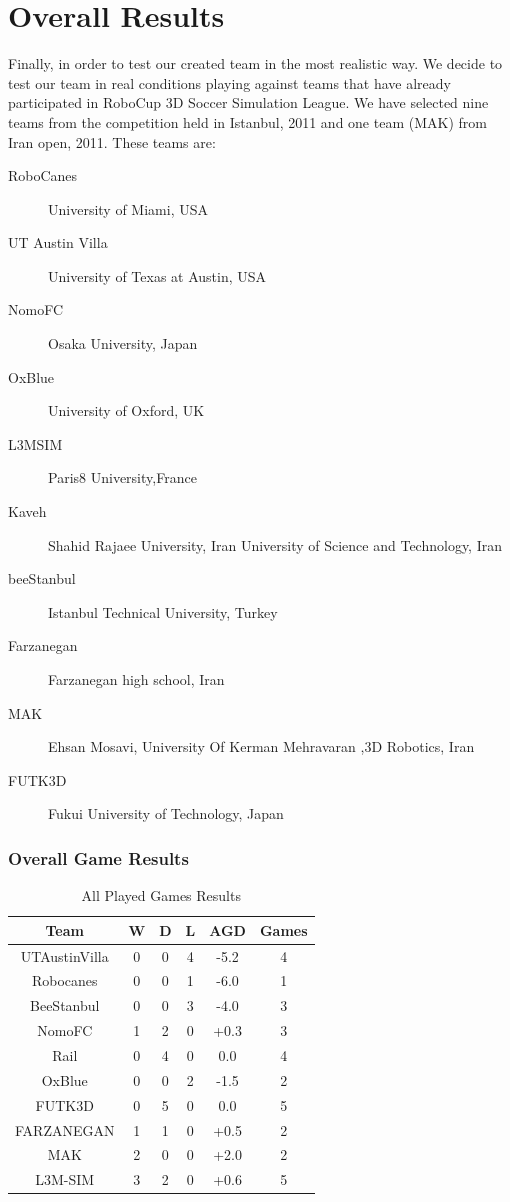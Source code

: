 \section{Overall Results}
Finally, in order to test our created team in the most realistic way. We decide to test our team in real conditions playing against teams that have already participated in RoboCup 3D Soccer Simulation League. We have selected nine teams from the competition held in Istanbul, 2011 and one team (MAK) from Iran open, 2011. These teams are:
\begin{description}
\item[RoboCanes]	University of Miami, USA 
\item[UT Austin Villa]	University of Texas at Austin, USA
\item[NomoFC]	Osaka University, Japan
\item[OxBlue]	University of Oxford, UK
\item[L3MSIM]	Paris8 University,France
\item[Kaveh] 	Shahid Rajaee University, Iran University of Science and Technology, Iran
\item[beeStanbul]	Istanbul Technical University, Turkey
\item[Farzanegan]	Farzanegan high school, Iran
\item[MAK]	Ehsan Mosavi, University Of Kerman Mehravaran ,3D Robotics, Iran
\item[FUTK3D]	Fukui University of Technology, Japan
\end{description}

\subsubsection*{Overall Game Results}

\begin{table}[t!]
\caption{All Played Games Results}
\label{GameResults}
\begin{center}
    \begin{tabular}{cccccc}
    \textbf{Team} 	& \textbf{W} & \textbf{D} & \textbf{L} & \textbf{AGD}\footnotemark 	& \textbf{Games}   \\
    \midrule
    UTAustinVilla 	& 0		& 0		& 4		& -5.2		& 4 			\\
    Robocanes 		& 0		& 0		& 1		& -6.0		& 1 			\\
    BeeStanbul		& 0		& 0		& 3		& -4.0		& 3				\\
    NomoFC 			& 1		& 2		& 0		& +0.3 		& 3 			\\
    Rail 			& 0		& 4		& 0		& 0.0 		& 4 			\\
    OxBlue 			& 0		& 0		& 2		& -1.5 		& 2 			\\
    FUTK3D 			& 0		& 5		& 0		& 0.0 		& 5 			\\
    FARZANEGAN 		& 1		& 1		& 0		& +0.5 		& 2 			\\
    MAK 		    & 2		& 0		& 0		& +2.0 		& 2 			\\
    L3M-SIM			& 3		& 2   	& 0		& +0.6 		& 5 			\\     
    \end{tabular}
\end{center}
\end{table}



